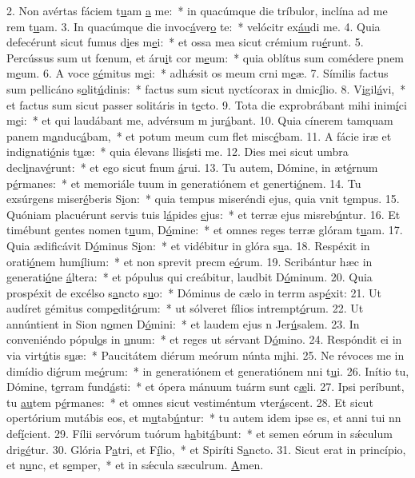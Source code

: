 2. Non avértas fáciem t\uline{u}am \uline{a} me:~* in quacúmque die tríbulor, inclína ad me rem t\uline{u}am.
3. In quacúmque die invoc\uline{á}ver\uline{o} te:~* velócitr ex\uline{áu}di me.
4. Quia defecérunt sicut fumus d\uline{i}es m\uline{e}i:~* et ossa mea sicut crémium ru\uline{é}runt.
5. Percússus sum ut fœnum, et áru\uline{i}t cor m\uline{e}um:~* quia oblítus sum comédere pnem m\uline{e}um.
6. A voce g\uline{é}mitus m\uline{e}i:~* adhǽsit os meum crni m\uline{e}æ.
7. Símilis factus sum pellicáno s\uline{o}lit\uline{ú}dinis:~* factus sum sicut nyctícorax in dmic\uline{í}lio.
8. V\uline{i}gil\uline{á}vi,~* et factus sum sicut passer solitáris in t\uline{e}cto.
9. Tota die exprobrábant mihi inim\uline{í}ci m\uline{e}i:~* et qui laudábant me, advérsum m jur\uline{á}bant.
10. Quia cínerem tamquam panem m\uline{a}nduc\uline{á}bam,~* et potum meum cum flet misc\uline{é}bam.
11. A fácie iræ et indignati\uline{ó}nis t\uline{u}æ:~* quia élevans llis\uline{í}sti me.
12. Dies mei sicut umbra decl\uline{i}nav\uline{é}runt:~* et ego sicut fnum \uline{á}rui.
13. Tu autem, Dómine, in æt\uline{é}rnum p\uline{é}rmanes:~* et memoriále tuum in generatiónem et generti\uline{ó}nem.
14. Tu exsúrgens miser\uline{é}beris S\uline{i}on:~* quia tempus miseréndi ejus, quia vnit t\uline{e}mpus.
15. Quóniam placuérunt servis tuis l\uline{á}pides \uline{e}jus:~* et terræ ejus misreb\uline{ú}ntur.
16. Et timébunt gentes nomen t\uline{u}um, D\uline{ó}mine:~* et omnes reges terræ glóram t\uline{u}am.
17. Quia ædificávit D\uline{ó}minus S\uline{i}on:~* et vidébitur in glóra s\uline{u}a.
18. Respéxit in orati\uline{ó}nem hum\uline{í}lium:~* et non sprevit precm e\uline{ó}rum.
19. Scribántur hæc in generati\uline{ó}ne \uline{á}ltera:~* et pópulus qui creábitur, laudbit D\uline{ó}minum.
20. Quia prospéxit de excélso s\uline{a}ncto s\uline{u}o:~* Dóminus de cælo in terrm asp\uline{é}xit:
21. Ut audíret gémitus comp\uline{e}dit\uline{ó}rum:~* ut sólveret fílios intrempt\uline{ó}rum.
22. Ut annúntient in Sion n\uline{o}men D\uline{ó}mini:~* et laudem ejus n Jer\uline{ú}salem.
23. In conveniéndo pópul\uline{o}s in \uline{u}num:~* et reges ut sérvant D\uline{ó}mino.
24. Respóndit ei in via virt\uline{ú}tis s\uline{u}æ:~* Paucitátem diérum meórum núnta m\uline{i}hi.
25. Ne révoces me in dimídio di\uline{é}rum me\uline{ó}rum:~* in generatiónem et generatiónem nni t\uline{u}i.
26. Inítio tu, Dómine, t\uline{e}rram fund\uline{á}sti:~* et ópera mánuum tuárm sunt c\uline{æ}li.
27. Ipsi períbunt, tu \uline{au}tem p\uline{é}rmanes:~* et omnes sicut vestiméntum vter\uline{á}scent.
28. Et sicut opertórium mutábis eos, et m\uline{u}tab\uline{ú}ntur:~* tu autem idem ipse es, et anni tui nn def\uline{í}cient.
29. Fílii servórum tuórum h\uline{a}bit\uline{á}bunt:~* et semen eórum in sǽculum drig\uline{é}tur.
30. Glória P\uline{a}tri, et F\uline{í}lio,~* et Spiríti S\uline{a}ncto.
31. Sicut erat in princípio, et n\uline{u}nc, et s\uline{e}mper,~* et in sǽcula sæculrum. \uline{A}men.
